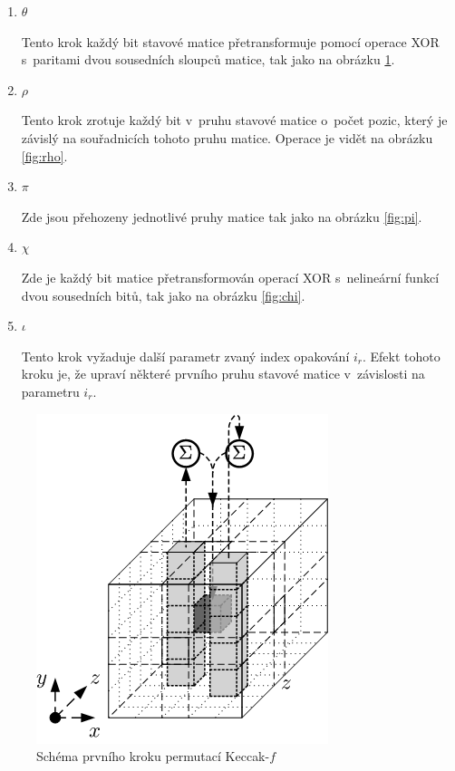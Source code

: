 \documentclass[titlepage,a4paper,12pt]{article}
\begin{document}
\begin{enumerate}
    \item \(\theta\) \par
    Tento krok každý bit stavové matice přetransformuje pomocí operace XOR s~paritami dvou sousedních sloupců matice, tak jako na obrázku \ref{fig:theta}.
    
    \item \(\rho\) \par
    Tento krok zrotuje každý bit v~pruhu stavové matice o~počet pozic, který je závislý na souřadnicích tohoto pruhu matice. Operace je vidět na obrázku \ref{fig:rho}.
    
    \item \(\pi\) \par
    Zde jsou přehozeny jednotlivé pruhy matice tak jako na obrázku \ref{fig:pi}.
    
    \item \(\chi\) \par
    Zde je každý bit matice přetransformován operací XOR s~nelineární funkcí dvou sousedních bitů, tak jako na obrázku \ref{fig:chi}.
    
    \item \(\iota\) \par
    Tento krok vyžaduje další parametr zvaný index opakování \(i_r\). Efekt tohoto kroku je, že upraví některé prvního pruhu stavové matice v~závislosti na parametru \(i_r\).
\end{enumerate}


    
\begin{figure}[ht!]
\centering
\includegraphics[scale=0.9]{theta.png}
\caption{Schéma prvního kroku permutací Keccak-\(f\)}
\label{fig:theta}
\end{figure}
\end{document}
